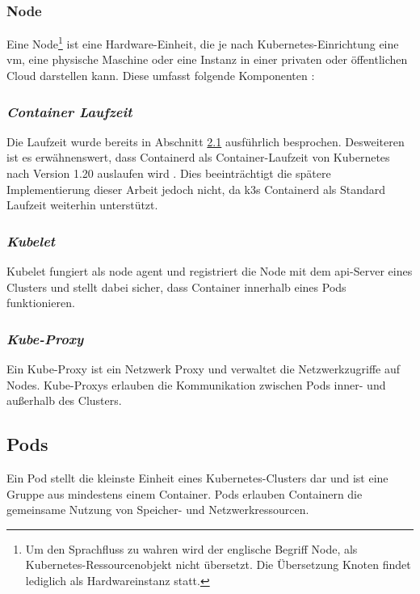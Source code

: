 \subsubsection{Node}
Eine Node\footnote{Um den Sprachfluss zu wahren wird der englische Begriff Node, als Kubernetes-Ressourcenobjekt nicht übersetzt. 
Die Übersetzung Knoten findet lediglich als Hardwareinstanz statt.} 
ist eine Hardware-Einheit, die je nach Kubernetes-Einrichtung eine \acs{vm}, eine physische Maschine oder 
eine Instanz in einer privaten oder öffentlichen Cloud darstellen kann.
Diese umfasst folgende Komponenten \cite{kubernetesnodes}:

\subsubsection{\textit{Container Laufzeit}}
Die Laufzeit wurde bereits in Abschnitt \hyperref[Docker]{2.1} ausführlich besprochen.
Desweiteren ist es erwähnenswert, dass Containerd als Container-Laufzeit von Kubernetes nach Version 1.20 auslaufen wird \cite{kubernetesdocker}.
Dies beeinträchtigt die spätere Implementierung dieser Arbeit jedoch nicht, da k3s Containerd als Standard Laufzeit weiterhin unterstützt.

\subsubsection{\textit{Kubelet}}
Kubelet fungiert als \glqq node agent\grqq{} und registriert die Node mit dem
\acs{api}-Server eines Clusters und stellt dabei sicher, dass Container innerhalb eines Pods
funktionieren.

\subsubsection{\textit{Kube-Proxy}}
Ein Kube-Proxy ist ein Netzwerk Proxy und verwaltet die Netzwerkzugriffe auf Nodes.
Kube-Proxys erlauben die Kommunikation zwischen Pods inner- und außerhalb des Clusters.

\subsection{Pods}
Ein Pod stellt die kleinste Einheit eines Kubernetes-Clusters dar und ist eine Gruppe aus mindestens einem Container.
Pods erlauben Containern die gemeinsame Nutzung von Speicher- und Netzwerkressourcen.

